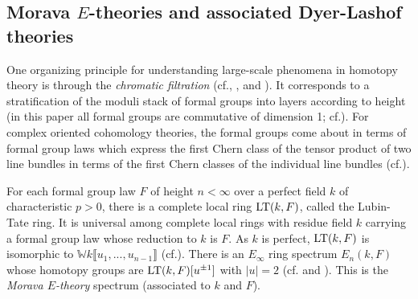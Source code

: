\documentclass{gtpart}
\theoremstyle{definition}
\theoremstyle{remark}
\newcommand{\mb}[1]{\mathbb{#1}}
\newcommand{\LT}{{\rm LT}}
\newcommand{\cf}[1]{cf.\thinspace{\cite{#1}}}
\newcommand{\cff}[2]{cf.\thinspace{\cite[#1]{#2}}}
\begin{document}
\subsection{Morava $E$-theories and associated Dyer-Lashof theories}

One organizing principle for understanding large-scale phenomena in homotopy 
theory is through the {\em chromatic filtration} (\cf{tafoverview}, 
\cite[section 17]{coctalos}, \cite[section 2.5]{orange} and \cite{green}).  It 
corresponds to a stratification of the moduli stack of formal groups into 
layers according to height (in this paper all formal groups are commutative of 
dimension 1; \cff{III.\S1}{fg}).  For complex oriented cohomology theories, 
the formal groups come about in terms of formal group laws which express the 
first Chern class of the tensor product of two line bundles in terms of the 
first Chern classes of the individual line bundles 
(\cff{section 1}{coctalos}).  

For each formal group law $F$ of height $n<\infty$ over a perfect field $k$ of 
characteristic $p>0$, there is a complete local ring $\LT(k,F)$, called the 
Lubin-Tate ring.  It is universal among complete local rings with residue 
field $k$ carrying a formal group law whose reduction to $k$ is $F$.  As $k$ 
is perfect, $\LT(k,F)$ is isomorphic to ${\mb W}k 
\llbracket u_1,...,u_{n-1} \rrbracket$ (\cff{sections 4.3 and 4.5}{H-Mthm}).  
There is an $E_\infty$ ring spectrum $E_n(k,F)$ whose homotopy groups are 
$\LT(k,F)[u^{\pm1}]$ with $|u| = 2$ (\cff{corollary 7.6}{GH} and 
\cite{H-Mthm}).  This is the {\em Morava $E$-theory} spectrum (associated to 
$k$ and $F$).  
\end{document}
